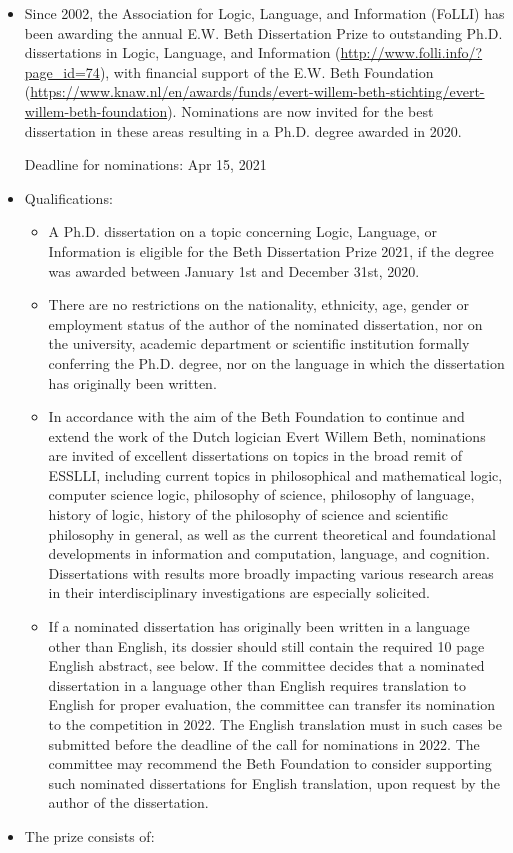 \documentclass{article}
\begin{document}
\begin{itemize}\item  Since 2002, the Association for Logic, Language, and Information (FoLLI) has been awarding the annual E.W. Beth Dissertation Prize to outstanding Ph.D. dissertations in Logic, Language, and Information (\href{http://www.folli.info/?page_id=74}{http://www.folli.info/?page\_id=74}), with financial support of the E.W. Beth Foundation (\href{https://www.knaw.nl/en/awards/funds/evert-willem-beth-stichting/evert-willem-beth-foundation}{https://www.knaw.nl/en/awards/funds/evert-willem-beth-stichting/evert-willem-beth-foundation}). Nominations are now invited for the best dissertation in these areas resulting in a Ph.D. degree awarded in 2020. 
 
Deadline for nominations: Apr 15, 2021 
 
\item  Qualifications: 
 
\begin{itemize}\item  A Ph.D. dissertation on a topic concerning Logic, Language, or Information is eligible for the Beth Dissertation Prize 2021, if the degree was awarded  between January 1st and December 31st, 2020.
\item  There are no restrictions on the nationality, ethnicity, age, gender or employment status of the author of the nominated dissertation, nor on the university, academic department or scientific institution formally conferring the Ph.D. degree, nor on the language in which the dissertation has originally been written.
\item   In accordance with the aim of the Beth Foundation to continue and extend the work of the Dutch logician Evert Willem Beth, nominations are invited of excellent dissertations on topics in the broad remit of ESSLLI, including current topics in philosophical and mathematical logic, computer science logic, philosophy of science, philosophy of language, history of logic, history of the philosophy of science and scientific philosophy in general, as well as the current theoretical and foundational developments in information and computation, language, and cognition. Dissertations with results more broadly impacting various research areas in their interdisciplinary investigations are especially solicited.
\item   If a nominated dissertation has originally been written in a language other than English, its dossier should still contain the required 10 page English abstract, see below. If the committee decides that a nominated dissertation in a language other than English requires translation to English for proper evaluation, the committee can transfer its nomination to the competition in 2022. The English translation must in such cases be submitted before the deadline of the call for nominations in 2022. The committee may recommend the Beth Foundation to consider supporting such nominated dissertations for English translation, upon request by the author of the dissertation.
\end{itemize} 
\item  The prize consists of: 
 

\end{itemize}
\end{document}
